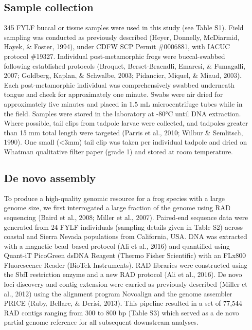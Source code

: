 \documentclass[twoside,12pt,final]{ucthesis-CA2012}
\begin{document}
\begin{ucmainmatter}
{\subsection{Sample collection}\label{sample-collection}}

345 FYLF buccal or tissue samples were used in this study (see Table
S1). Field sampling was conducted as previously described (Heyer,
Donnelly, McDiarmid, Hayek, \& Foster, 1994), under CDFW SCP Permit
\#0006881, with IACUC protocol \#19327. Individual post-metamorphic
frogs were buccal-swabbed following established protocols (Broquet,
Berset-Braendli, Emaresi, \& Fumagalli, 2007; Goldberg, Kaplan, \&
Schwalbe, 2003; Pidancier, Miquel, \& Miaud, 2003). Each
post-metamorphic individual was comprehensively swabbed underneath
tongue and cheek for approximately one minute. Swabs were air dried for
approximately five minutes and placed in 1.5 mL microcentrifuge tubes
while in the field. Samples were stored in the laboratory at -80°C until
DNA extraction. Where possible, tail clips from tadpole larvae were
collected, and tadpoles greater than 15 mm total length were targeted
(Parris et al., 2010; Wilbur \& Semlitsch, 1990). One small
(\textless{}3mm) tail clip was taken per individual tadpole and dried on
Whatman qualitative filter paper (grade 1) and stored at room
temperature.

\hypertarget{de-novo-assembly}{%
\subsection{De novo assembly}\label{de-novo-assembly}}

To produce a high-quality genomic resource for a frog species with a
large genome size, we first interrogated a large fraction of the genome
using RAD sequencing (Baird et al., 2008; Miller et al., 2007).
Paired-end sequence data were generated from 24 FYLF individuals
(sampling details given in Table S2) across coastal and Sierra Nevada
populations from California, USA. DNA was extracted with a magnetic
bead--based protocol (Ali et al., 2016) and quantified using Quant-iT
PicoGreen dsDNA Reagent (Thermo Fisher Scientific) with an FLx800
Fluorescence Reader (BioTek Instruments). RAD libraries were constructed
using the SbfI restriction enzyme and a new RAD protocol (Ali et al.,
2016). De novo loci discovery and contig extension were carried as
previously described (Miller et al., 2012) using the alignment program
Novoalign and the genome assembler PRICE (Ruby, Bellare, \& Derisi,
2013). This pipeline resulted in a set of 77,544 RAD contigs ranging
from 300 to 800 bp (Table S3) which served as a de novo partial genome
reference for all subsequent downstream analyses.


\end{ucmainmatter}
\end{document}
